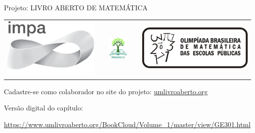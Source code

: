 \begin{center}
Projeto: LIVRO ABERTO DE MATEMÁTICA

\noindent \begin{tabular}{lcccr}
\includegraphics[scale=.15]{impa}& \quad\quad& \includegraphics[width=3cm]{logo} & \quad\quad& \includegraphics[scale=.24]{obmep} 
\end{tabular}
\end{center}

\vspace*{.3cm}

Cadastre-se como colaborador no site do projeto: \url{umlivroaberto.org}

Versão digital do capítulo:

\url{https://www.umlivroaberto.org/BookCloud/Volume_1/master/view/GE301.html}


